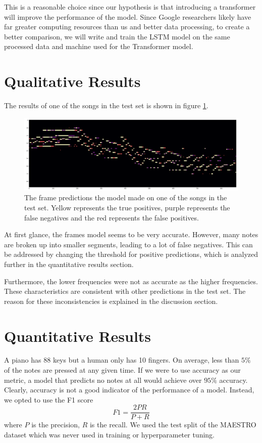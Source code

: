 \documentclass[a4paper,twocolumn,10pt]{article}
\begin{document}
This is a reasonable choice since our hypothesis is that introducing a transformer will improve the performance of the model. Since Google researchers likely have far greater computing resources than us and better data processing, to create a better comparison, we will write and train the LSTM model on the same processed data and machine used for the Transformer model.  

\section{Qualitative Results}
The results of one of the songs in the test set is shown in figure \ref{fig:results}.
\begin{figure}
  \centering
  \includegraphics[width=\linewidth]{figures/results.png}
  \caption{The frame predictions the model made on one of the songs in the test set. Yellow represents the true positives, purple represents the false negatives and the red represents the false positives.}
  \label{fig:results}
\end{figure}
At first glance, the frames model seems to be very accurate. However, many notes are broken up into smaller segments, leading to a lot of false negatives. This can be addressed by changing the threshold for positive predictions, which is analyzed further in the quantitative results section.

Furthermore, the lower frequencies were not as accurate as the higher frequencies. These characteristics are consistent with other predictions in the test set. The reason for these inconsistencies is explained in the discussion section.
\section{Quantitative Results}

A piano has 88 keys but a human only has 10 fingers. On average, less than $5\%$ of the notes are pressed at any given time. If we were to use accuracy as our metric, a model that predicts no notes at all would achieve over $95\%$ accuracy. Clearly, accuracy is not a good indicator of the performance of a model. Instead, we opted to use the F1 score
\begin{equation}
  F1 = \frac{2PR}{P+R}
\end{equation}
where $P$ is the precision, $R$ is the recall. We used the test split of the MAESTRO dataset which was never used in training or hyperparameter tuning.
\end{document}
